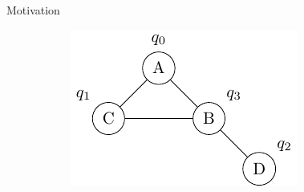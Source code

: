 \documentclass{beamer}
\begin{document}
\begin{frame}{Motivation}
\begin{figure}
\begin{subfigure}[b]{0.45\textwidth}
\begin{overprint}
		\centering
		\includegraphics[scale=0.6]{figures/default_mapped}		
		\end{overprint}
     \end{subfigure}
     \hfill %
\end{figure}
\pause


\end{frame}
\end{document}
